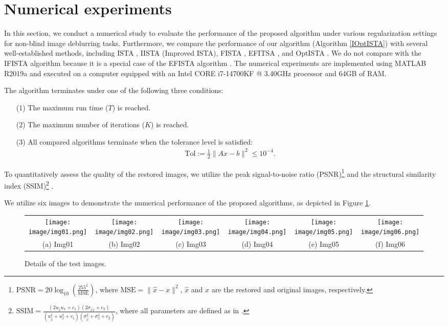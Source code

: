 \documentclass{article}
\begin{document}
\section{Numerical experiments} \label{numerical_part}
In this section, we conduct a numerical study to evaluate the performance of the proposed algorithm under various regularization settings for non-blind image deblurring tasks. Furthermore, we compare the performance of our algorithm (Algorithm \ref{IOptISTA}) with several well-established methods, including ISTA \cite{DaubechiesDM04}, IISTA (Improved ISTA), FISTA \cite{BeckT09}, EFITSA \cite{KumarS24}, and OptISTA \cite{JangGR23}. We do not compare with the IFISTA algorithm \cite{BhottoAS15} because it is a special case of the EFISTA algorithm \cite{KumarS24}. The numerical experiments are implemented using MATLAB R2019a and executed on a computer equipped with an Intel CORE i7-14700KF @ 3.40GHz processor and 64GB of RAM. %

The algorithm terminates under one of the following three conditions:
\begin{itemize}
    \item[(1)] The maximum run time ($T$) is reached.
    \item[(2)] The maximum number of iterations ($K$) is reached.
    \item[(3)] All compared algorithms terminate when the tolerance level is satisfied:
    \begin{eqnarray}
        \text{Tol} := \frac{1}{2} \|Ax - b\|^2 \leq 10^{-4}.
    \end{eqnarray}
\end{itemize}

To quantitatively assess the quality of the restored images, we utilize the peak signal-to-noise ratio (PSNR)\footnote{$\text{PSNR} = 20 \log_{10} \left( \frac{255^2}{\text{MSE}} \right)$, where $\text{MSE} = \|\hat{x} - x\|^2$, $\hat{x}$ and $x$ are the restored and original images, respectively.} and the structural similarity index (SSIM)\footnote{$\text{SSIM} = \frac{(2u_{\hat{x}}u_{x} + c_1)(2\sigma_{\hat{x}x} + c_2)}{(u_{\hat{x}}^2 + u_x^2 + c_1)(\sigma_{\hat{x}}^2 + \sigma_x^2 + c_2)}$, where all parameters are defined as in \cite{WangBSS04}.} \cite{WangBSS04}.

We utilize six images to demonstrate the numerical performance of the proposed algorithms, as depicted in Figure \ref{details_images}. 
\begin{figure}[!ht]
	\setlength\tabcolsep{2pt}
	\centering
	\begin{tabular}{cccccc} 
		\texttt{[image: image/img01.png]} & \texttt{[image: image/img02.png]}&
		\texttt{[image: image/img03.png]}&
		\texttt{[image: image/img04.png]}& \texttt{[image: image/img05.png]}&
		\texttt{[image: image/img06.png]}\\
		(a) Img01 & (b) Img02 & (c) Img03&(d) Img04 & (e) Img05 & (f) Img06
	\end{tabular}
	\caption{Details of the test images.} 
	\label{details_images}
\end{figure}
\end{document}
